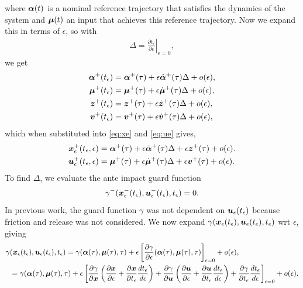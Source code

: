 \documentclass[../DC2017114Bouma.tex]{subfiles}
\begin{document}
where $\boldsymbol{\alpha}(t)$ is a nominal reference trajectory that satisfies the dynamics of the system and $\boldsymbol{\mu}(t)$ an input that achieves this reference trajectory. Now we expand this in terms of $\epsilon$, so with
\begin{align}
\Delta = \left.\frac{\partial t_\epsilon}{\partial\epsilon}\right|_{\epsilon=0},
\end{align} 
we get
\begin{align}
\boldsymbol{\alpha}^{+}(t_\epsilon) &= \boldsymbol{\alpha}^{+}(\tau) + \epsilon \dot{\boldsymbol{\alpha}}^{+}(\tau)\Delta + o(\epsilon),\\
\boldsymbol{\mu}^{+}(t_\epsilon) &= \boldsymbol{\mu}^{+}(\tau) + \epsilon \dot{\boldsymbol{\mu}}^{+}(\tau)\Delta + o(\epsilon),\\
{\boldsymbol{z}}^{+}(t_\epsilon) &= {\boldsymbol{z}}^{+}(\tau) + \epsilon \dot{{\boldsymbol{z}}}^{+}(\tau)\Delta + o(\epsilon),\\
{\boldsymbol{v}}^{+}(t_\epsilon) &= {\boldsymbol{v}}^{+}(\tau) + \epsilon \dot{{\boldsymbol{v}}}^{+}(\tau)\Delta + o(\epsilon),
\end{align}
which when substituted into \eqref{eq:xe} and \eqref{eq:ue} gives,
\begin{align}
{\boldsymbol{x}}^{+}_\epsilon(t_\epsilon,\epsilon) &= \boldsymbol{\alpha}^{+}(\tau) + \epsilon \dot{\boldsymbol{\alpha}}^{+}(\tau)\Delta + \epsilon {\boldsymbol{z}}^{+}(\tau) + o(\epsilon). \label{eq:xeexp}\\
{\boldsymbol{u}}^{+}_\epsilon(t_\epsilon,\epsilon) &= \boldsymbol{\mu}^{+}(\tau) + \epsilon \dot{\boldsymbol{\mu}}^{+}(\tau)\Delta + \epsilon {\boldsymbol{v}}^{+}(\tau) + o(\epsilon). \label{eq:ueexp}
\end{align}
 To find $\Delta$, we evaluate the ante impact guard function
\begin{align}
\gamma^{-}( {\boldsymbol{x}}^{-}_\epsilon(t_\epsilon),{\boldsymbol{u}}^{-}_\epsilon(t_\epsilon),t_\epsilon) = 0.
\end{align}
In previous work, the guard function $\gamma$ was not dependent on ${\boldsymbol{u}}_\epsilon(t_\epsilon)$ because friction and release was not considered. We now expand $\gamma({\boldsymbol{x}}_\epsilon(t_\epsilon),{\boldsymbol{u}}_\epsilon(t_\epsilon),t_\epsilon)$ wrt $\epsilon$, giving
\begin{align}
\gamma&({\boldsymbol{x}}_\epsilon(t_\epsilon),{\boldsymbol{u}}_\epsilon(t_\epsilon),t_\epsilon) = \gamma( \boldsymbol{\alpha}(\tau), \boldsymbol{\mu}(\tau),\tau) + \epsilon\left[\frac{\partial \gamma}{\partial\epsilon}(\boldsymbol{\alpha}(\tau),\boldsymbol{\mu}(\tau),\tau)\right]_{\epsilon=0} + o(\epsilon),\\
&= \gamma( \boldsymbol{\alpha}(\tau), \boldsymbol{\mu}(\tau),\tau) + \epsilon\left[ \frac{\partial\gamma}{\partial{\boldsymbol{x}}}\left(\frac{\partial{\boldsymbol{x}}}{\partial\epsilon} + \frac{\partial{\boldsymbol{x}}}{\partial t_\epsilon}\frac{d t_\epsilon}{d\epsilon}\right) + \frac{\partial\gamma}{\partial{\boldsymbol{u}}}\left(\frac{\partial{\boldsymbol{u}}}{\partial\epsilon} + \frac{\partial{\boldsymbol{u}}}{\partial t_\epsilon}\frac{d t_\epsilon}{d\epsilon}\right) + \frac{\partial\gamma}{\partial t_\epsilon}\frac{d t_\epsilon}{d\epsilon}  \right]_{\epsilon=0} + o(\epsilon). \label{eq:gamma}
\end{align}
\end{document}
